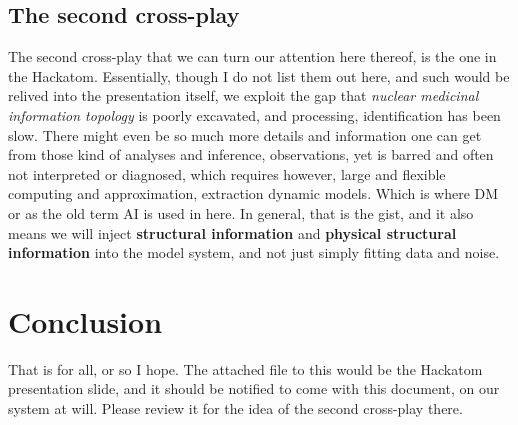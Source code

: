 \documentclass[9pt,a4paper]{article}
\begin{document}
\subsection{The second cross-play}
The second cross-play that we can turn our attention here thereof, is the one in the Hackatom. Essentially, though I do not list them out here, and such would be relived into the presentation itself, we exploit the gap that \textit{nuclear medicinal information topology} is poorly excavated, and processing, identification has been slow. There might even be so much more details and information one can get from those kind of analyses and inference, observations, yet is barred and often not interpreted or diagnosed, which requires however, large and flexible computing and approximation, extraction dynamic models. Which is where DM or as the old term AI is used in here. In general, that is the gist, and it also means we will inject \textbf{structural information} and \textbf{physical structural information} into the model system, and not just simply fitting data and noise. 

\section{Conclusion}

That is for all, or so I hope. The attached file to this would be the Hackatom presentation slide, and it should be notified to come with this document, on our system at will. Please review it for the idea of the second cross-play there. 

\newgeometry{} %



\printbibliography %
\end{document}
